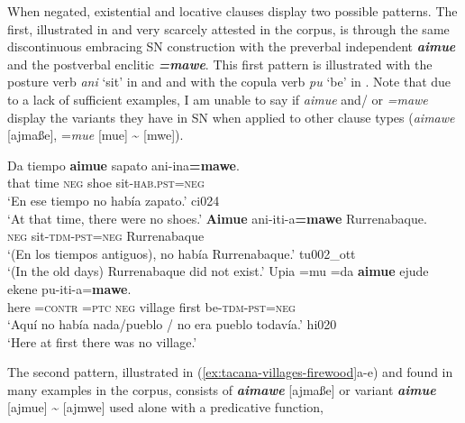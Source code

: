 \documentclass[output=paper]{langsci/langscibook}
\begin{document}
When negated, existential and locative clauses display two possible
patterns. The first, illustrated in  and very
scarcely attested in the corpus, is through the same discontinuous
embracing SN construction with the preverbal independent
\textbf{\textit{aimue}} and the postverbal enclitic
\textbf{\textit{=mawe}}. This first pattern is illustrated with the posture
verb \textit{ani} `sit' in  and
 and with the copula verb \textit{pu}
`be' in . Note that due to a
lack of sufficient examples, I am unable to say if \textit{aimue} and\slash
or \textit{=mawe} display the variants they have in SN when applied to
other clause types (\textit{aimawe} [ajmaße], =\textit{mue} [mue] 
{\textasciitilde} [mwe]).
%
\begin{exe}\ex\label{ex:tacana-oldtimes}\begin{xlist}
\ex\label{ex:tacana-oldtimes-noshoes}
\gll {\ob}Da tiempo{\cb} \textbf{aimue} sapato
ani-ina\textbf{=mawe}.\\
    that  time  \textsc{neg}  shoe  sit-\textsc{hab.pst=neg}\\
\glt `En ese tiempo no había zapato.' ci024\\
`At that time, there were no shoes.'
\ex\label{ex:tacana-oldtimes-Rurrenabaque}
\gll \textbf{Aimue} ani-iti-a\textbf{=mawe}
Rurrenabaque.\\
    \textsc{neg}  sit-\textsc{tdm-pst=neg}  Rurrenabaque\\
\glt `(En los tiempos antiguos), no había Rurrenabaque.' tu002\_ott\\
`(In the old days) Rurrenabaque did not exist.'
\ex\label{ex:tacana-oldtimes-village}
\gll {}Upia  =mu  =da \textbf{aimue} ejude ekene
pu-iti-a=\textbf{mawe}.\\
    here  =\textsc{contr}  \textsc{=ptc}  \textsc{neg}  village  first
    be-\textsc{tdm}-\textsc{pst=neg}\\
\glt `Aquí no había nada/pueblo \slash{}  no era pueblo todavía.' hi020\\
`Here at first there was no village.'
\end{xlist}\end{exe}
%
The second pattern, illustrated in (\ref{ex:tacana-villages-firewood}a-e)
and found in many examples in the corpus, consists of
\textbf{\textit{aimawe}} [ajmaße] or variant \textbf{\textit{aimue}}
[ajmue] {\textasciitilde} [ajmwe] used alone with a predicative function,
\end{document}
